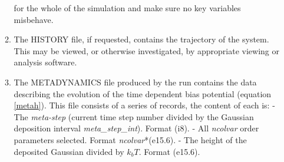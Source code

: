 \begin{enumerate}
\begin{enumerate}
  for the whole of the simulation and make sure no key variables misbehave.
\item The HISTORY file, if requested, contains the trajectory of the
  system. This may be viewed, or otherwise investigated, by appropriate viewing
  or analysis software.
\item The METADYNAMICS file produced by the run contains the data describing
  the evolution of the time dependent bias potential (equation \ref{metah}).
  This file consists of a series of records, the content of each is:\newline
  - The {\em meta-step} (current time step number divided by the Gaussian 
  deposition interval {\em meta\_step\_int}). Format (i8).\newline
  - All {\em ncolvar} order parameters selected. Format {\em ncolvar}*(e15.6).\newline
  - The height of the deposited Gaussian divided by $k_{b}T$. Format (e15.6).
\end{enumerate}
  
\end{enumerate}

